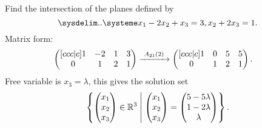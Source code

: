 \begin{example}
    Find the intersection of the planes defined by
    \[
        \linsys{
            x_1-2x_2+x_3=3,
            x_2+2x_3=1
        }
        .
    \]
    Matrix form:
    \begin{align*}
        \begin{pmatrix}[ccc|c]
            1&-2&1&3\\
            0&1&2&1\\
        \end{pmatrix}
        &\eroarrow{A_{21}(2)}{}
        \begin{pmatrix}[ccc|c]
            1&0&5&5\\
            0&1&2&1\\
        \end{pmatrix}
        .
    \end{align*}
    Free variable is $x_3=\lambda$, this gives the solution set
    \[
        \left\{
            \begin{pmatrix}
                x_1\\x_2\\x_3\\
            \end{pmatrix}
            \in\mathbb R^3\;\middle\vert\;
            \begin{pmatrix}
                x_1\\x_2\\x_3\\
            \end{pmatrix}
            =
            \begin{pmatrix}
                5-5\lambda\\
                1-2\lambda\\
                \lambda\\
            \end{pmatrix}
        \right\}
        .
    \]
\end{example}

